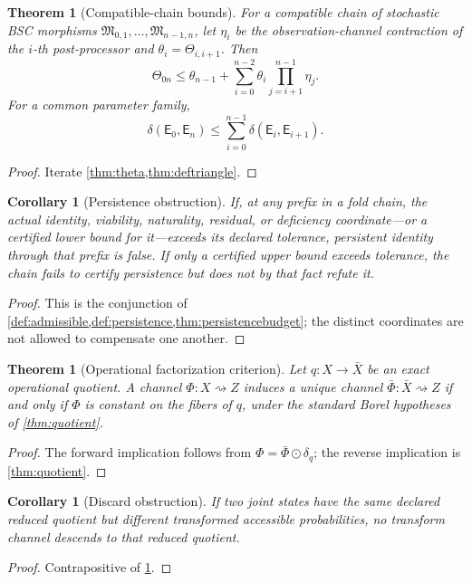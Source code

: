 \documentclass[11pt,a4paper]{article}
\theoremstyle{definition}
\theoremstyle{plain}
\newtheorem{theorem}[definition]{Theorem}
\newtheorem{corollary}[definition]{Corollary}
\theoremstyle{remark}
\begin{document}
\begin{theorem}[Compatible-chain bounds]\label{thm:chain}
For a compatible chain of stochastic BSC morphisms
\(\mathfrak M_{0,1},\ldots,\mathfrak M_{n-1,n}\), let
\(\eta_i\) be the observation-channel contraction of the \(i\)-th
post-processor and \(\theta_i=\Theta_{i,i+1}\).  Then
\[
\Theta_{0n}\le
\theta_{n-1}+\sum_{i=0}^{n-2}
\theta_i\prod_{j=i+1}^{n-1}\eta_j.
\]
For a common parameter family,
\[
\delta(\mathsf E_0,\mathsf E_n)
\le\sum_{i=0}^{n-1}\delta(\mathsf E_i,\mathsf E_{i+1}).
\]
\end{theorem}
\begin{proof}
Iterate \cref{thm:theta,thm:deftriangle}.
\end{proof}

\begin{corollary}[Persistence obstruction]\label{cor:persistobstruct}
If, at any prefix in a fold chain, the actual identity, viability,
naturality, residual, or deficiency coordinate---or a certified lower
bound for it---exceeds its declared tolerance, persistent identity through
that prefix is false.  If only a certified upper bound exceeds tolerance, the
chain fails to certify persistence but does not by that fact refute it.
\end{corollary}
\begin{proof}
This is the conjunction of
\cref{def:admissible,def:persistence,thm:persistencebudget}; the distinct
coordinates are not allowed to compensate one another.
\end{proof}

\begin{theorem}[Operational factorization criterion]\label{thm:opfactor}
Let \(q:X\to\bar X\) be an exact operational quotient.  A channel
\(\Phi:X\rightsquigarrow Z\) induces a unique channel
\(\bar\Phi:\bar X\rightsquigarrow Z\) if and only if \(\Phi\) is constant on
the fibers of \(q\), under the standard Borel hypotheses of
\cref{thm:quotient}.
\end{theorem}
\begin{proof}
The forward implication follows from
\(\Phi=\bar\Phi\odot\delta_q\); the reverse implication is
\cref{thm:quotient}.
\end{proof}

\begin{corollary}[Discard obstruction]\label{cor:discard}
If two joint states have the same declared reduced quotient but different
transformed accessible probabilities, no transform channel descends to that
reduced quotient.
\end{corollary}
\begin{proof}
Contrapositive of \cref{thm:opfactor}.
\end{proof}
\end{document}
